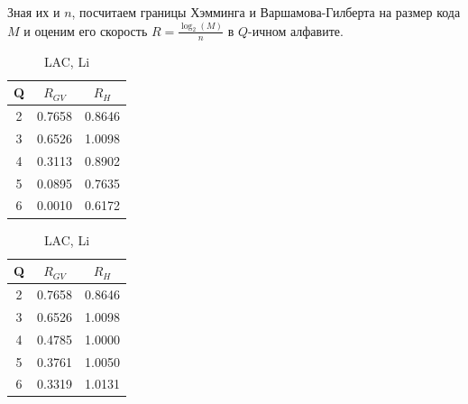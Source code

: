 Зная их и $n$, посчитаем границы Хэмминга и Варшамова-Гилберта на размер кода $M$ и оценим его скорость $R = \frac{\log_2(M)}n$ в $Q$-ичном алфавите.

\begin{table}[h]
	\centering
	\begin{minipage}{0.48\textwidth}
		\centering
		\begin{tabular}{|c|c|c|}
			\hline Q & $R_{GV}$ & $R_H$ \\ \hline
			2 & 0.7658 & 0.8646 \\ \hline
			3 & 0.6526 & 1.0098 \\ \hline
			4 & 0.3113 & 0.8902 \\ \hline
			5 & 0.0895 & 0.7635 \\ \hline
			6 & 0.0010 & 0.6172 \\ \hline
		\end{tabular}
		\caption*{LAC, Hamming}
	\end{minipage}
	\begin{minipage}{0.48\textwidth}
		\centering
		\begin{tabular}{|c|c|c|}
			\hline Q & $R_{GV}$ & $R_H$ \\ \hline
			2 & 0.7658 & 0.8646 \\ \hline
			3 & 0.6526 & 1.0098 \\ \hline
			4 & 0.4785 & 1.0000 \\ \hline
			5 & 0.3761 & 1.0050 \\ \hline
			6 & 0.3319 & 1.0131 \\ \hline
		\end{tabular}
		\caption*{LAC, Li}
	\end{minipage}
	
	\bigskip
	

\end{table}
